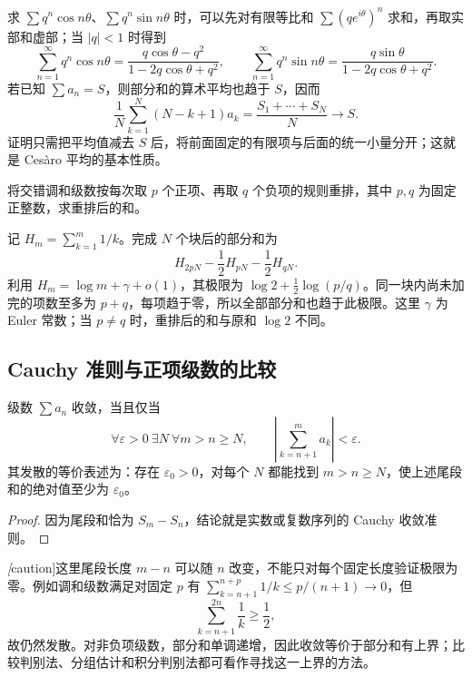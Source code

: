 求 $\sum q^n\cos n\theta$、$\sum q^n\sin n\theta$ 时，可以先对有限等比和 $\sum(qe^{i\theta})^n$ 求和，再取实部和虚部；当 $|q|<1$ 时得到
\[
 \sum_{n=1}^{\infty}q^n\cos n\theta
 =\frac{q\cos\theta-q^2}{1-2q\cos\theta+q^2},\qquad
 \sum_{n=1}^{\infty}q^n\sin n\theta
 =\frac{q\sin\theta}{1-2q\cos\theta+q^2}.
\]
若已知 $\sum a_n=S$，则部分和的算术平均也趋于 $S$，因而
\begin{equation}
 \frac1N\sum_{k=1}^{N}(N-k+1)a_k
 =\frac{S_1+\cdots+S_N}{N}\longrightarrow S.
 \label{eq:pei-cesaro-series}
\end{equation}
证明只需把平均值减去 $S$ 后，将前面固定的有限项与后面的统一小量分开；这就是 Cesàro 平均的基本性质。

\begin{example}
将交错调和级数按每次取 $p$ 个正项、再取 $q$ 个负项的规则重排，其中 $p,q$ 为固定正整数，求重排后的和。
\end{example}
\begin{solve}
记 $H_m=\sum_{k=1}^{m}1/k$。完成 $N$ 个块后的部分和为
\[
 H_{2pN}-\frac12H_{pN}-\frac12H_{qN}.
\]
利用 $H_m=\log m+\gamma+o(1)$，其极限为 $\log2+\tfrac12\log(p/q)$。同一块内尚未加完的项数至多为 $p+q$，每项趋于零，所以全部部分和也趋于此极限。这里 $\gamma$ 为 Euler 常数；当 $p\ne q$ 时，重排后的和与原和 $\log2$ 不同。
\end{solve}

\subsection{Cauchy 准则与正项级数的比较}

\begin{theorem}
\label{thm:pei-series-cauchy}
级数 $\sum a_n$ 收敛，当且仅当
\[
 \forall\varepsilon>0\ \exists N\ \forall m>n\geq N,
 \qquad\left|\sum_{k=n+1}^{m}a_k\right|<\varepsilon.
\]
其发散的等价表述为：存在 $\varepsilon_0>0$，对每个 $N$ 都能找到 $m>n\geq N$，使上述尾段和的绝对值至少为 $\varepsilon_0$。
\end{theorem}
\begin{proof}
因为尾段和恰为 $S_m-S_n$，结论就是实数或复数序列的 Cauchy 收敛准则。
\end{proof}

\emph[caution]{这里尾段长度 $m-n$ 可以随 $n$ 改变，不能只对每个固定长度验证极限为零。}例如调和级数满足对固定 $p$ 有 $\sum_{k=n+1}^{n+p}1/k\leq p/(n+1)\to0$，但
\[
 \sum_{k=n+1}^{2n}\frac1k\geq\frac12,
\]
故仍然发散。对非负项级数，部分和单调递增，因此收敛等价于部分和有上界；比较判别法、分组估计和积分判别法都可看作寻找这一上界的方法。

